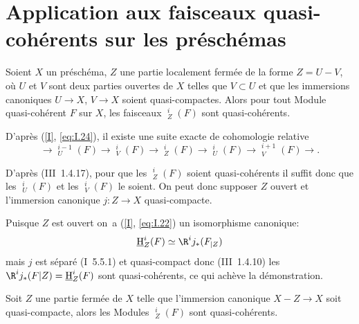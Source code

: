 \chapter[Faisceaux quasi-coh\'erents sur les pr\'esch\'emas]{Application aux faisceaux quasi-coh\'erents sur les pr\'esch\'emas} \label{II}

\makeatletter{}\makeatother{}

\begin{supproposition} \label{II.1}
Soient $X$ un pr\'esch\'ema, $Z$ une partie localement ferm\'ee de la forme $Z=U-V$, o\`u $U$ et $V$ sont deux parties ouvertes de $X$ telles que $V\subset U$ et que les immersions canoniques $U\to X$, $V\to X$ soient quasi-compactes. Alors pour tout Module quasi-coh\'erent $F$ sur $X$, les faisceaux ${\mathop{\underline{\mathrm{H}}}\nolimits}_Z^i(F)$ sont quasi-coh\'erents.
\end{supproposition}

D'apr\`es (\ref{I}, \ref{eq:I.24}), il existe une suite exacte de cohomologie relative
$$
\to {\mathop{\underline{\mathrm{H}}}\nolimits}_U^{i-1}(F) \to {\mathop{\underline{\mathrm{H}}}\nolimits}_V^{i}(F) \to {\mathop{\underline{\mathrm{H}}}\nolimits}_Z^{i}(F) \to {\mathop{\underline{\mathrm{H}}}\nolimits}_U^{i}(F) \to {\mathop{\underline{\mathrm{H}}}\nolimits}_V^{i+1}(F) \to.
$$

D'apr\`es (\EGA III~1.4.17), pour que les ${\mathop{\underline{\mathrm{H}}}\nolimits}_Z^i(F)$ soient quasi-coh\'erents il suffit donc que les ${\mathop{\underline{\mathrm{H}}}\nolimits}_U^i(F)$ et les ${\mathop{\underline{\mathrm{H}}}\nolimits}_V^i(F)$ le soient. On peut donc supposer $Z$ ouvert et l'immersion canonique $j:Z\to X$ quasi-compacte.

Puisque $Z$ est ouvert on~a (\ref{I}, \ref{eq:I.22}) un isomorphisme canonique:
$$
{\mathop{\underline{\mathrm{H}}}\nolimits}_Z^{i}(F) \simeq \R^ij_{*}(F_{|Z})
$$
mais $j$ est s\'epar\'e (\EGA I~5.5.1) et quasi-compact donc (\EGA III~1.4.10) les $\R^ij_{*}(F|Z)={\mathop{\underline{\mathrm{H}}}\nolimits}_Z^{i}(F)$ sont quasi-coh\'erents, ce qui ach\`eve la d\'emonstration.

\begin{supcorollaire} \label{II.2}
Soit $Z$ une partie ferm\'ee de $X$ telle que l'immersion canonique \hbox{$X-Z\to X$} soit quasi-compacte, alors les Modules ${\mathop{\underline{\mathrm{H}}}\nolimits}_Z^i(F)$ sont quasi-coh\'erents.
\end{supcorollaire}

